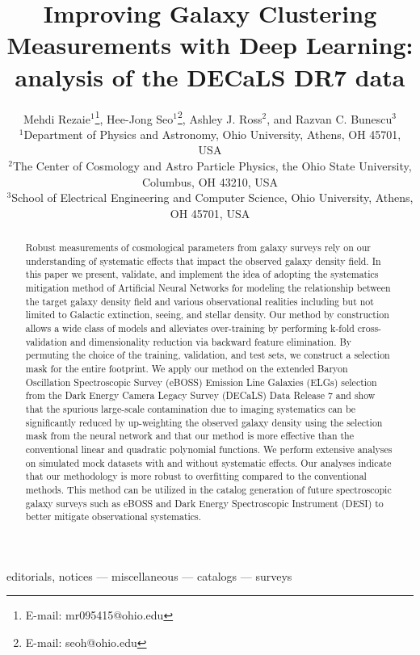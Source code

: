 \documentclass[fleqn, usenatbib]{mnras}
\title[Improving Galaxy Clustering with Deep Learning]{Improving Galaxy Clustering Measurements with Deep Learning: analysis of the DECaLS DR7 data}
\author[M. Rezaie et al.]{
Mehdi Rezaie$^{1}$\thanks{E-mail: mr095415@ohio.edu},
Hee-Jong Seo$^{1}$\thanks{E-mail: seoh@ohio.edu},
Ashley J. Ross$^{2}$,
and Razvan C. Bunescu$^{3}$
\\
$^{1}$Department of Physics and Astronomy, Ohio University, Athens, OH 45701, USA\\
$^{2}$The Center of Cosmology and Astro Particle Physics, the Ohio State University, Columbus, OH 43210, USA\\
$^{3}$School of Electrical Engineering and Computer Science, Ohio University, Athens, OH 45701, USA
}
\begin{document}
\label{firstpage}
\pagerange{\pageref{firstpage}--\pageref{lastpage}}
\maketitle

\begin{abstract}
Robust measurements of cosmological parameters from galaxy surveys rely on our understanding of systematic effects that impact the observed galaxy density field. In this paper we present, validate, and implement the idea of adopting the systematics mitigation method of Artificial Neural Networks for modeling the relationship between the target galaxy density field and various observational realities including but not limited to Galactic extinction, seeing, and stellar density. Our method by construction allows a wide class of models and alleviates over-training by performing k-fold cross-validation and dimensionality reduction via backward feature elimination. By permuting the choice of the training, validation, and test sets, we construct a selection mask for the entire footprint.  We apply our method on the extended Baryon Oscillation Spectroscopic Survey (eBOSS) Emission Line Galaxies (ELGs) selection from the Dark Energy Camera Legacy Survey (DECaLS) Data Release 7 and show that the spurious large-scale contamination due to imaging systematics can be significantly reduced by up-weighting the observed galaxy density using the selection mask from the neural network and that our method is more effective than the conventional linear and quadratic polynomial functions. We perform extensive analyses on simulated mock datasets with and without systematic effects. Our analyses indicate that our methodology is more robust to overfitting compared to the conventional methods. This method can be utilized in the catalog generation of future spectroscopic galaxy surveys such as eBOSS and Dark Energy Spectroscopic Instrument (DESI) to better mitigate observational systematics.
\end{abstract}

\begin{keywords}
editorials, notices --- 
miscellaneous --- catalogs --- surveys
\end{keywords}








\end{document}
